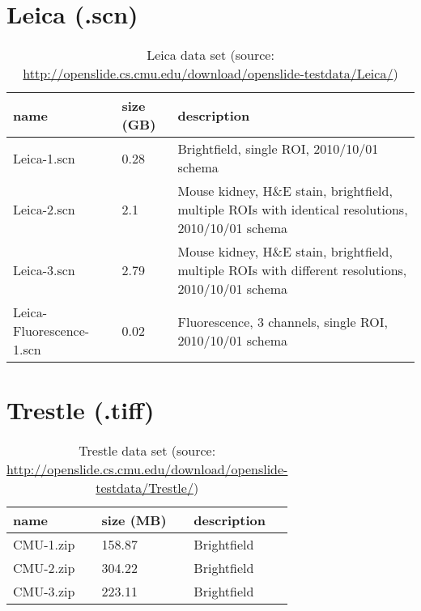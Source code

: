 \section{Leica (.scn)}

\begin{table}[H]
	\begin{center}
		\begin{tabular}{| p{4cm} | p{2cm} | p{5cm} |}
			\hline
			\textbf{name} & \textbf{size (GB)} & \textbf{description} \\ \hline
			Leica-1.scn & 0.28 & Brightfield, single ROI, 2010/10/01 schema \\ \hline
			Leica-2.scn & 2.1 & Mouse kidney, H\&E stain, brightfield, multiple ROIs with identical resolutions, 2010/10/01 schema \\ \hline
			Leica-3.scn	 & 2.79 & Mouse kidney, H\&E stain, brightfield, multiple ROIs with different resolutions, 2010/10/01 schema \\ \hline
			Leica-Fluorescence-1.scn & 0.02 & Fluorescence, 3 channels, single ROI, 2010/10/01 schema \\ \hline
		\end{tabular}
		\caption{Leica data set (source: \url{http://openslide.cs.cmu.edu/download/openslide-testdata/Leica/})}
	\end{center}
\end{table}


\section{Trestle (.tiff)}

\begin{table}[H]
	\begin{center}
		\begin{tabular}{| p{4cm} | p{2cm} | p{5cm} |}
			\hline
			\textbf{name} & \textbf{size (MB)} & \textbf{description} \\ \hline
			 CMU-1.zip & 158.87 & Brightfield \\ \hline
			 CMU-2.zip & 304.22 & Brightfield \\ \hline
			 CMU-3.zip & 223.11 & Brightfield \\ \hline
		\end{tabular}
		\caption{Trestle data set (source: \url{http://openslide.cs.cmu.edu/download/openslide-testdata/Trestle/})}
	\end{center}
\end{table}


